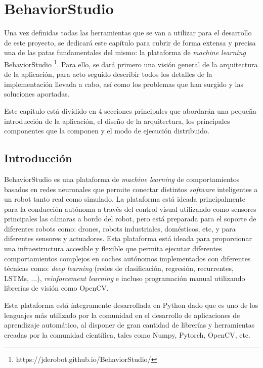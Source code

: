 \chapter{BehaviorStudio}

Una vez definidas todas las herramientas que se van a utilizar para el desarrollo de este proyecto, se dedicará este capítulo para cubrir de forma extensa y precisa una de las patas fundamentales del mismo: la plataforma de \textit{machine learning} BehaviorStudio \footnote{https://jderobot.github.io/BehaviorStudio/}.
Para ello, se dará primero una visión general de la arquitectura de la aplicación, para acto seguido describir todos los detalles de la implementación llevada a cabo, así como los problemas que han surgido y las soluciones aportadas.

Este capítulo está dividido en 4 secciones principales que abordarán una pequeña introducción de la aplicación, el diseño de la arquitectura, los principales componentes que la componen y el modo de ejecución distribuido.

\section{Introducción}

BehaviorStudio es una plataforma de \textit{machine learning} de comportamientos basados en redes neuronales que permite conectar distintos \textit{software} inteligentes a un robot tanto real como simulado. La plataforma está ideada principalmente para la conducción autónoma a través del control visual utilizando como sensores principales las cámaras a bordo del robot, pero está preparada para el soporte de diferentes robots como: drones, robots industriales, domésticos, etc, y para diferentes sensores y actuadores. Esta plataforma está ideada para proporcionar una infraestructura accesible y flexible que permita ejecutar diferentes comportamientos complejos en coches autónomos implementados con diferentes técnicas como: \textit{deep learning} (redes de clasificación, regresión, recurrentes, LSTMs, ...), \textit{reinforcement learning} e incluso programación manual utilizando librerías de visión como OpenCV.

Esta plataforma está íntegramente desarrollada en Python dado que es uno de los lenguajes más utilizado por la comunidad en el desarrollo de aplicaciones de aprendizaje automático, al disponer de gran cantidad de librerías y herramientas creadas por la comunidad científica, tales como Numpy, Pytorch, OpenCV, etc.

